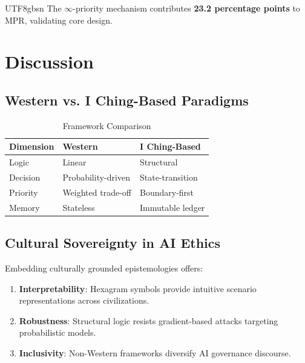 \documentclass[conference]{IEEEtran}
\begin{document}
\begin{CJK}{UTF8}{gbsn}
The $\infty$-priority mechanism contributes \textbf{23.2 percentage points} to MPR, validating core design.

\section{Discussion}

\subsection{Western vs. I Ching-Based Paradigms}

\begin{table}[h]
\centering
\caption{Framework Comparison}
\label{tab:framework_comp}
\begin{tabular}{lll}
\toprule
\textbf{Dimension} & \textbf{Western} & \textbf{I Ching-Based} \\
\midrule
Logic & Linear & Structural \\
Decision & Probability-driven & State-transition \\
Priority & Weighted trade-off & Boundary-first \\
Memory & Stateless & Immutable ledger \\
\bottomrule
\end{tabular}
\end{table}

\subsection{Cultural Sovereignty in AI Ethics}

Embedding culturally grounded epistemologies offers:

\begin{enumerate}
    \item \textbf{Interpretability}: Hexagram symbols provide intuitive scenario representations across civilizations.
    
    \item \textbf{Robustness}: Structural logic resists gradient-based attacks targeting probabilistic models.
    
    \item \textbf{Inclusivity}: Non-Western frameworks diversify AI governance discourse.
\end{enumerate}


\end{CJK}
\end{document}
